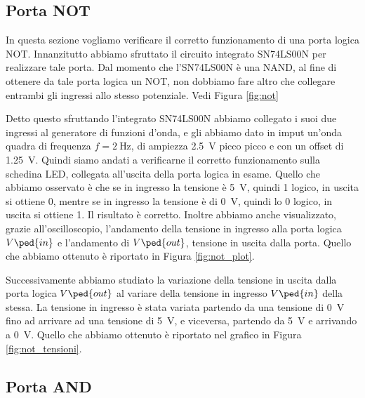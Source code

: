 \subsection*{Porta NOT}

In questa sezione vogliamo verificare il corretto funzionamento di una porta logica NOT. Innanzitutto abbiamo sfruttato il circuito integrato SN74LS00N per realizzare tale porta. Dal momento che l'SN74LS00N è una NAND, al fine di ottenere da tale porta logica un NOT, non dobbiamo fare altro che collegare entrambi gli ingressi allo stesso potenziale. Vedi Figura \ref{fig:not}

Detto questo sfruttando l'integrato SN74LS00N abbiamo collegato i suoi due ingressi al generatore di funzioni d'onda, e gli abbiamo dato in imput un'onda quadra di frequenza $f=\SI{2}{\hertz}$, di ampiezza \SI{2.5}{\volt} picco picco e con un offset di \SI{1.25}{\volt}.
Quindi siamo andati a verificarne il corretto funzionamento sulla schedina LED, collegata all'uscita della porta logica in esame. Quello che abbiamo osservato è che se in ingresso la tensione è \SI{+5}{\volt}, quindi 1 logico, in uscita si ottiene 0, mentre se in ingresso la tensione è di \SI{0}{\volt}, quindi lo 0 logico, in uscita si ottiene 1. Il risultato è corretto. Inoltre abbiamo anche visualizzato, grazie all'oscilloscopio, l'andamento della tensione in ingresso alla porta logica $V\ped{in}$ e l'andamento di $V\ped{out}$, tensione in uscita dalla porta. Quello che abbiamo ottenuto è riportato in Figura \ref{fig:not_plot}.

Successivamente abbiamo studiato la variazione della tensione in uscita dalla porta logica $V\ped{out}$ al variare della tensione in ingresso $V\ped{in}$ della stessa. La tensione in ingresso è stata variata partendo da una tensione di \SI{0}{\volt} fino ad arrivare ad una tensione di \SI{+5}{\volt}, e viceversa, partendo da \SI{+5}{\volt} e arrivando a \SI{0}{\volt}. Quello che abbiamo ottenuto è riportato nel grafico in Figura \ref{fig:not_tensioni}.


\subsection*{Porta AND}

